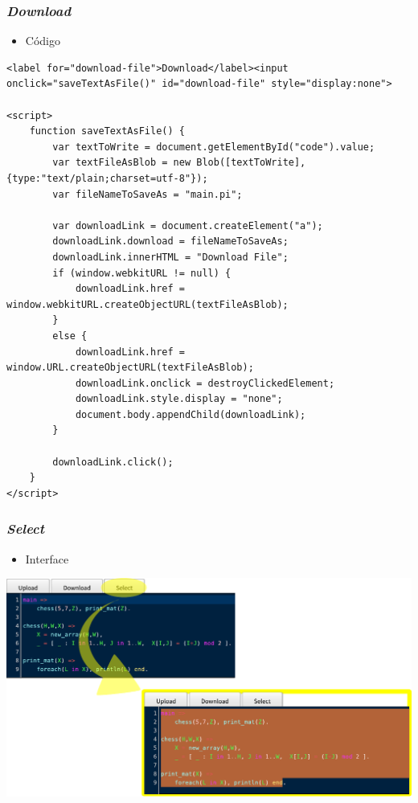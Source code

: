 \documentclass[brazil]{beamer}
\begin{document}
\begin{frame}[fragile]

    \frametitle{\textit{Download}}

    \begin{itemize}
      \item Código
    \end{itemize}

\begin{lstlisting}
<label for="download-file">Download</label><input onclick="saveTextAsFile()" id="download-file" style="display:none">

<script>
    function saveTextAsFile() {
        var textToWrite = document.getElementById("code").value;
        var textFileAsBlob = new Blob([textToWrite], {type:"text/plain;charset=utf-8"});
        var fileNameToSaveAs = "main.pi";

        var downloadLink = document.createElement("a");
        downloadLink.download = fileNameToSaveAs;
        downloadLink.innerHTML = "Download File";
        if (window.webkitURL != null) {
            downloadLink.href = window.webkitURL.createObjectURL(textFileAsBlob);
        }
        else {
            downloadLink.href = window.URL.createObjectURL(textFileAsBlob);
            downloadLink.onclick = destroyClickedElement;
            downloadLink.style.display = "none";
            document.body.appendChild(downloadLink);
        }

        downloadLink.click();
    }
</script>
\end{lstlisting}

\end{frame}



\begin{frame}

    \frametitle{\textit{Select}}

    \begin{itemize}
      \item Interface
    \end{itemize}

\begin{center}
\includegraphics[width=.8\textwidth]{figures/func-select.pdf}
\end{center}

\end{frame}
\end{document}
